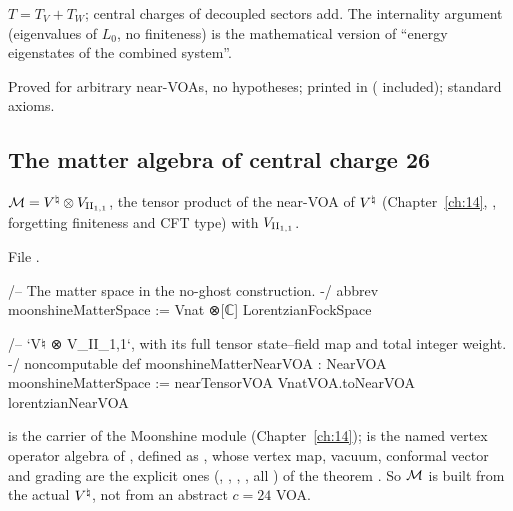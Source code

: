 \begin{physics}
$T=T_V+T_W$; central charges of decoupled sectors add.  The internality argument (eigenvalues of $L_0$, no
finiteness) is the mathematical version of ``energy eigenstates of the combined system''.
\end{physics}

\begin{status}
Proved for arbitrary near-VOAs, no hypotheses; printed in 
( included); standard axioms.
\end{status}

\subsection{The matter algebra of central charge 26}

\begin{definition}\label{ch17:def:matter}
$\mathcal{M}={V^{\natural}}\otimes{V_{\mathrm{II}_{1,1}}}$, the tensor product of the near-VOA of ${V^{\natural}}$ (Chapter~\ref{ch:14},
, forgetting finiteness and CFT type) with ${V_{\mathrm{II}_{1,1}}}$.
\end{definition}

\noindent File .
\begin{leancode}
/-- The matter space in the no-ghost construction. -/
abbrev moonshineMatterSpace := Vnat ⊗[ℂ] LorentzianFockSpace

/-- `V♮ ⊗ V_{II_{1,1}}`, with its full tensor state–field map and total integer weight. -/
noncomputable def moonshineMatterNearVOA : NearVOA moonshineMatterSpace :=
  nearTensorVOA VnatVOA.toNearVOA lorentzianNearVOA
\end{leancode}

\begin{dictionary}
 is the carrier of the Moonshine module (Chapter~\ref{ch:14});  is the named vertex operator algebra of ,
defined as , whose vertex map, vacuum, conformal vector and grading are the
explicit ones (, , , , all
) of the theorem .  So $\mathcal{M}$ is built from the actual ${V^{\natural}}$, not from an
abstract $c=24$ VOA.
\end{dictionary}


